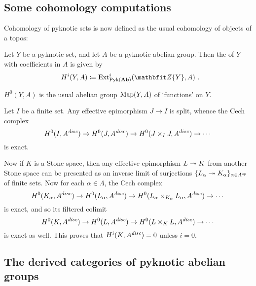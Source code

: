 \subsection{Some cohomology computations}

Cohomology of pyknotic sets is now defined as the usual cohomology of objects of a topos:

\begin{dfn}
	Let $ Y $ be a pyknotic set, and let $ A $ be a pyknotic abelian group.
	Then the  of $ Y $ with coefficients in $ A $ is given by
	\[
		H^i(Y, A) \coloneq \Ext^i_{\Pyk(\Ab)}( \ZZ\{ Y \}, A) \period
	\]
\end{dfn}

\begin{exm}
	$ H^0(Y, A) $ is the usual abelian group $ \operatorname{Map}(Y, A) $ of `functions' on $ Y $.
\end{exm}

\begin{exm}
	Let $ I $ be a finite set.
	Any effective epimorphism $ J \to I $ is split, whence the Cech complex
	\[
		H^0(I, A^{\textit{disc}}) \to H^0(J, A^{\textit{disc}}) \to H^0(J \times_{I} J, A^{disc}) \to \cdots
	\]
	is exact.

	Now if $ K $ is a Stone space, then any effective epimorphism $ L \twoheadrightarrow K $ from another Stone space can be presented as an inverse limit of surjections $ \{ L_{\alpha} \surjection K_{\alpha} \}_{\alpha \in \Lambda^{\op}} $ of finite sets.
	Now for each $ \alpha \in \Lambda $, the Cech complex
	\[
		H^0(K_{\alpha}, A^{disc}) \to H^0(L_{\alpha}, A^{\textit{disc}}) \to H^0(L_{\alpha} \times_{K_{\alpha}} L_{\alpha}, A^{\textit{disc}}) \to \cdots
	\]
	is exact, and so its filtered colimit
	\[
		H^0(K, A^{\textit{disc}}) \to H^0(L, A^{\textit{disc}}) \to H^0(L \times_{K} L, A^{\textit{disc}}) \to \cdots
	\]
	is exact as well.
	This proves that $ H^i(K, A^{\textit{disc}}) = 0 $ unless $ i = 0 $.
\end{exm}



\subsection{The derived categories of pyknotic abelian groups}

